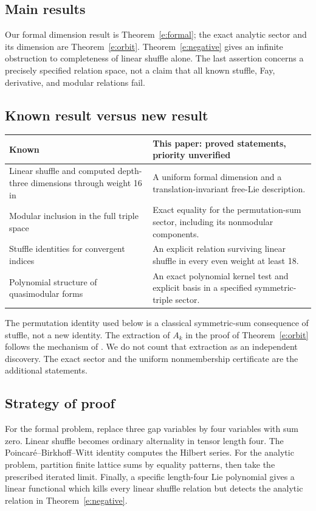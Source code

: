 \documentclass[12pt]{amsart}
\theoremstyle{definition}
\theoremstyle{remark}
\numberwithin{equation}{section}
\numberwithin{equation}{section}
\begin{document}
\subsection{Main results}
Our formal dimension result is Theorem~\ref{e:formal}; the exact analytic
sector and its dimension are Theorem~\ref{e:orbit}. Theorem~\ref{e:negative}
gives an infinite obstruction to completeness of linear shuffle alone.
The last assertion concerns a precisely specified relation space, not a
claim that all known stuffle, Fay, derivative, and modular relations fail.

\subsection{Known result versus new result}
\begin{center}\small
\begin{tabular}{p{}p{}}
\toprule Known & This paper: proved statements, priority unverified\\\midrule
Linear shuffle and computed depth-three dimensions through weight 16
in \cite[Table 4]{hst} & A uniform formal dimension and a translation-invariant
free-Lie description.\\
Modular inclusion in the full triple space & Exact equality for the
permutation-sum sector, including its nonmodular components.\\
Stuffle identities for convergent indices & An explicit relation surviving
linear shuffle in every even weight at least 18.\\
Polynomial structure of quasimodular forms & An exact polynomial kernel
test and explicit basis in a specified symmetric-triple sector.\\\bottomrule
\end{tabular}\end{center}
The permutation identity used below is a classical symmetric-sum consequence
of stuffle, not a new identity. The extraction of $A_k$ in the proof of
Theorem~\ref{e:orbit} follows the mechanism of \cite[Lemma 6.5]{hst}.
We do not count that extraction as an independent discovery. The exact sector
and the uniform nonmembership certificate are the additional statements.

\subsection{Strategy of proof}
For the formal problem, replace three gap variables by four variables with
sum zero. Linear shuffle becomes ordinary alternality in tensor length four.
The Poincar\'e--Birkhoff--Witt identity computes the Hilbert series. For the
analytic problem, partition finite lattice sums by equality patterns, then
take the prescribed iterated limit. Finally, a specific length-four Lie
polynomial gives a linear functional which kills every linear shuffle
relation but detects the analytic relation in Theorem~\ref{e:negative}.
\end{document}
